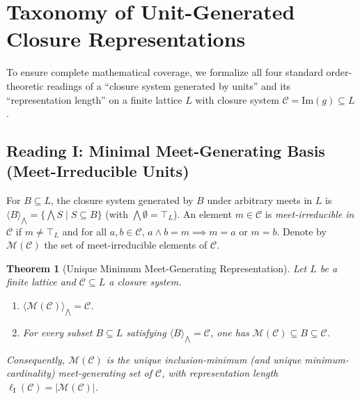 \documentclass[11pt,a4paper]{article}
\newtheorem{theorem}{Theorem}[section]
\theoremstyle{definition}
\theoremstyle{remark}
\begin{document}
\section{Taxonomy of Unit-Generated Closure Representations}

To ensure complete mathematical coverage, we formalize all four standard order-theoretic readings of a ``closure system generated by units'' and its ``representation length'' on a finite lattice $L$ with closure system $\mathcal{C} = \mathrm{Im}(g) \subseteq L$.

\subsection{Reading I: Minimal Meet-Generating Basis (Meet-Irreducible Units)}

For $B \subseteq L$, the closure system generated by $B$ under arbitrary meets in $L$ is $\langle B \rangle_{\bigwedge} = \{ \bigwedge S \mid S \subseteq B \}$ (with $\bigwedge \emptyset = \top_L$). An element $m \in \mathcal{C}$ is \emph{meet-irreducible in $\mathcal{C}$} if $m \neq \top_L$ and for all $a, b \in \mathcal{C}$, $a \wedge b = m \implies m = a \text{ or } m = b$. Denote by $\mathcal{M}(\mathcal{C})$ the set of meet-irreducible elements of $\mathcal{C}$.

\begin{theorem}[Unique Minimum Meet-Generating Representation]\label{thm:meet-irred}
Let $L$ be a finite lattice and $\mathcal{C} \subseteq L$ a closure system.
\begin{enumerate}
\item $\langle \mathcal{M}(\mathcal{C}) \rangle_{\bigwedge} = \mathcal{C}$.
\item For every subset $B \subseteq L$ satisfying $\langle B \rangle_{\bigwedge} = \mathcal{C}$, one has $\mathcal{M}(\mathcal{C}) \subseteq B \subseteq \mathcal{C}$.
\end{enumerate}
Consequently, $\mathcal{M}(\mathcal{C})$ is the unique inclusion-minimum (and unique minimum-cardinality) meet-generating set of $\mathcal{C}$, with representation length $\ell_{\mathrm{I}}(\mathcal{C}) = |\mathcal{M}(\mathcal{C})|$.
\end{theorem}
\end{document}
